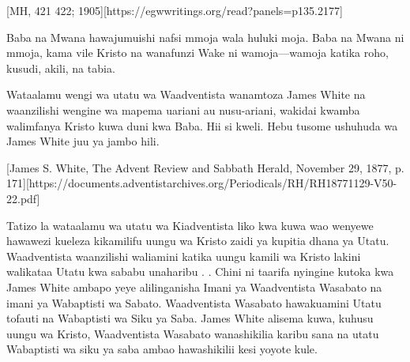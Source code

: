 [MH, 421 422; 1905][https://egwwritings.org/read?panels=p135.2177]


Baba na Mwana hawajumuishi nafsi mmoja wala huluki moja. Baba na Mwana ni mmoja, kama vile Kristo na wanafunzi Wake ni wamoja—wamoja katika roho, kusudi, akili, na tabia.


Wataalamu wengi wa utatu wa Waadventista wanamtoza James White na waanzilishi wengine wa mapema uariani au nusu-ariani, wakidai kwamba walimfanya Kristo kuwa duni kwa Baba. Hii si kweli. Hebu tusome ushuhuda wa James White juu ya jambo hili.




[James S. White, The Advent Review and Sabbath Herald, November 29, 1877, p. 171][https://documents.adventistarchives.org/Periodicals/RH/RH18771129-V50-22.pdf]


Tatizo la wataalamu wa utatu wa Kiadventista liko kwa kuwa wao wenyewe hawawezi kueleza kikamilifu uungu wa Kristo zaidi ya kupitia dhana ya Utatu. Waadventista waanzilishi waliamini katika uungu kamili wa Kristo lakini walikataa Utatu kwa sababu unaharibu . . Chini ni taarifa nyingine kutoka kwa James White ambapo yeye alilinganisha Imani ya Waadventista Wasabato na imani ya Wabaptisti wa Sabato. Waadventista Wasabato hawakuamini Utatu tofauti na Wabaptisti wa Siku ya Saba. James White alisema kuwa, kuhusu uungu wa Kristo, Waadventista Wasabato wanashikilia karibu sana na utatu Wabaptisti wa siku ya saba ambao hawashikilii kesi yoyote kule.


